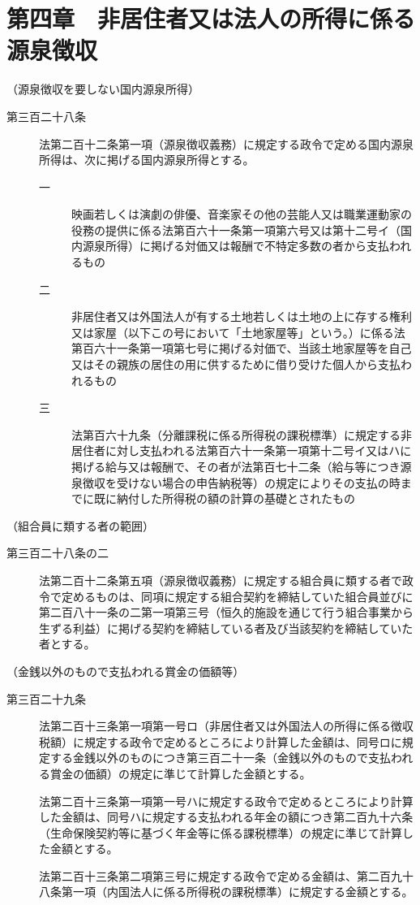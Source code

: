 \documentclass[twocolumn,a4j,10pt]{ltjtarticle}
\begin{document}
\section*{第四章　非居住者又は法人の所得に係る源泉徴収}
\noindent\hspace{10pt}（源泉徴収を要しない国内源泉所得）
\begin{description}
\item[第三百二十八条]法第二百十二条第一項（源泉徴収義務）に規定する政令で定める国内源泉所得は、次に掲げる国内源泉所得とする。
\begin{description}
\item[一]映画若しくは演劇の俳優、音楽家その他の芸能人又は職業運動家の役務の提供に係る法第百六十一条第一項第六号又は第十二号イ（国内源泉所得）に掲げる対価又は報酬で不特定多数の者から支払われるもの
\item[二]非居住者又は外国法人が有する土地若しくは土地の上に存する権利又は家屋（以下この号において「土地家屋等」という。）に係る法第百六十一条第一項第七号に掲げる対価で、当該土地家屋等を自己又はその親族の居住の用に供するために借り受けた個人から支払われるもの
\item[三]法第百六十九条（分離課税に係る所得税の課税標準）に規定する非居住者に対し支払われる法第百六十一条第一項第十二号イ又はハに掲げる給与又は報酬で、その者が法第百七十二条（給与等につき源泉徴収を受けない場合の申告納税等）の規定によりその支払の時までに既に納付した所得税の額の計算の基礎とされたもの
\end{description}
\end{description}
\noindent\hspace{10pt}（組合員に類する者の範囲）
\begin{description}
\item[第三百二十八条の二]法第二百十二条第五項（源泉徴収義務）に規定する組合員に類する者で政令で定めるものは、同項に規定する組合契約を締結していた組合員並びに第二百八十一条の二第一項第三号（恒久的施設を通じて行う組合事業から生ずる利益）に掲げる契約を締結している者及び当該契約を締結していた者とする。
\end{description}
\noindent\hspace{10pt}（金銭以外のもので支払われる賞金の価額等）
\begin{description}
\item[第三百二十九条]法第二百十三条第一項第一号ロ（非居住者又は外国法人の所得に係る徴収税額）に規定する政令で定めるところにより計算した金額は、同号ロに規定する金銭以外のものにつき第三百二十一条（金銭以外のもので支払われる賞金の価額）の規定に準じて計算した金額とする。
\item[]法第二百十三条第一項第一号ハに規定する政令で定めるところにより計算した金額は、同号ハに規定する支払われる年金の額につき第二百九十六条（生命保険契約等に基づく年金等に係る課税標準）の規定に準じて計算した金額とする。
\item[]法第二百十三条第二項第三号に規定する政令で定める金額は、第二百九十八条第一項（内国法人に係る所得税の課税標準）に規定する金額とする。
\end{description}
\end{document}

